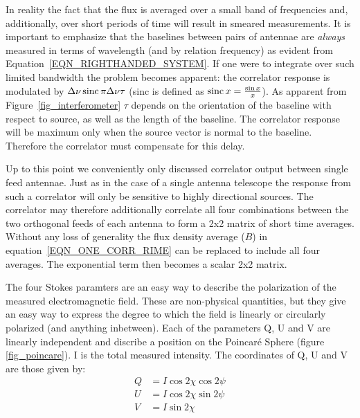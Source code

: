 In reality the fact that the flux is averaged over a small band of frequencies and, additionally, over short periods of 
time will result in smeared measurements. It is important to emphasize that the baselines between pairs of antennae are 
\textit{always} measured in terms of wavelength (and by relation frequency) as evident from Equation~\ref{EQN_RIGHTHANDED_SYSTEM}.
If one were to integrate over such limited bandwidth the problem becomes apparent: the correlator response
is modulated by $\Delta\nu\operatorname*{sinc}{\pi\Delta\nu\tau}$ (sinc is defined as $\operatorname*{sinc}{x} = \frac{\sin{x}}{x}$). As apparent from
Figure~\ref{fig_interferometer} $\tau$ depends on the orientation of the baseline with respect to source, as well as the length of the 
baseline. The correlator response will be maximum only when the source vector is normal to the baseline. Therefore the 
correlator must compensate for this delay.

Up to this point we conveniently only discussed correlator output between single feed antennae.
Just as in the case of a single antenna telescope the response from such a correlator will only be sensitive to highly 
directional sources. The correlator may therefore additionally correlate all four combinations between the two orthogonal 
feeds of each antenna to form a 2x2 matrix of short time averages. Without any loss of generality the flux density 
average ($B$) in equation~\ref{EQN_ONE_CORR_RIME} can be replaced to include all four averages. The exponential term 
then becomes a scalar 2x2 matrix.

The four Stokes paramters are an easy way to describe the polarization of the measured electromagnetic field. These 
are non-physical quantities, but they give an easy way to express the degree to which the field is linearly or circularly polarized
(and anything inbetween). Each of the parameters Q, U and V are linearly independent and discribe a position on the 
Poincar\'e Sphere (figure \ref{fig_poincare}). I is the total measured intensity. The coordinates of Q, U and V are
those given by:
\begin{equation}
\begin{split}
Q &= I\cos{2\chi}\cos{2\psi}\\
U &= I\cos{2\chi}\sin{2\psi}\\
V &= I\sin{2\chi}\\
\end{split}
\end{equation}

